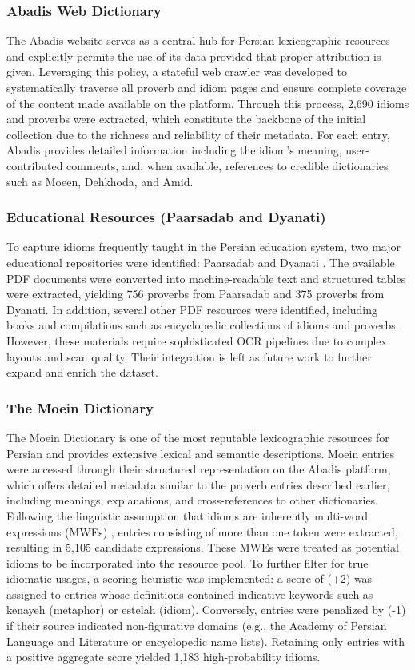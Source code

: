 \documentclass[11pt,a4paper]{article}
\begin{document}
\subsubsection{Abadis Web Dictionary}
The Abadis website \cite{abadi_dictionary} serves as a central hub for Persian lexicographic resources and explicitly permits the use of its data provided that proper attribution is given. Leveraging this policy, a stateful web crawler was developed to systematically traverse all proverb and idiom pages and ensure complete coverage of the content made available on the platform. Through this process, 2,690 idioms and proverbs were extracted, which constitute the backbone of the initial collection due to the richness and reliability of their metadata. For each entry, Abadis provides detailed information including the idiom’s meaning, user-contributed comments, and, when available, references to credible dictionaries such as Moeen, Dehkhoda, and Amid.

\subsubsection{Educational Resources (Paarsadab and Dyanati)}
To capture idioms frequently taught in the Persian education system, two major educational repositories were identified: Paarsadab \cite{paarsadab_dictionary} and Dyanati \cite{dyanati_resources}. The available PDF documents were converted into machine-readable text and structured tables were extracted, yielding 756 proverbs from Paarsadab and 375 proverbs from Dyanati. In addition, several other PDF resources were identified, including books and compilations such as encyclopedic collections of idioms and proverbs. However, these materials require sophisticated OCR pipelines due to complex layouts and scan quality. Their integration is left as future work to further expand and enrich the dataset.

\subsubsection{The Moein Dictionary}
The Moein Dictionary is one of the most reputable lexicographic resources for Persian and provides extensive lexical and semantic descriptions. Moein entries were accessed through their structured representation on the Abadis platform, which offers detailed metadata similar to the proverb entries described earlier, including meanings, explanations, and cross-references to other dictionaries. Following the linguistic assumption that idioms are inherently multi-word expressions (MWEs) \cite{findlay-2017-multiword}, entries consisting of more than one token were extracted, resulting in 5,105 candidate expressions. These MWEs were treated as potential idioms to be incorporated into the resource pool. To further filter for true idiomatic usages, a scoring heuristic was implemented: a score of (+2) was assigned to entries whose definitions contained indicative keywords such as kenayeh (metaphor) or estelah (idiom). Conversely, entries were penalized by (-1) if their source indicated non-figurative domains (e.g., the Academy of Persian Language and Literature or encyclopedic name lists). Retaining only entries with a positive aggregate score yielded 1,183 high-probability idioms.
\end{document}

